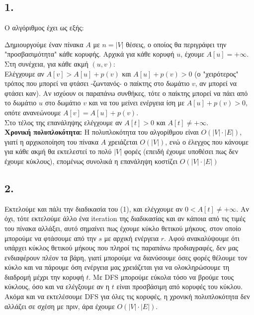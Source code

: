	\subsection*{1.}

		Ο αλγόριθμος έχει ως εξής:
		
		Δημιουργούμε έναν πίνακα $A$ με $n = |V|$ θέσεις, ο οποίος θα περιγράφει την "προσβασιμότητα" κάθε κορυφής. Αρχικά για κάθε κορυφή $u$, έχουμε $A[u] = +\infty$. Στη συνέχεια, για κάθε ακμή $(u, v)$: \\
		
		Ελέγχουμε αν $A[v] > A[u] + p(v)$ και $A[u] + p(v) > 0$ (ο "χειρότερος" τρόπος που μπορεί να φτάσει -ζωντανός- ο παίκτης στο δωμάτιο $v$, αν μπορεί να φτάσει καν). Αν ισχύουν οι παραπάνω συνθήκες, τότε ο παίκτης μπορεί να πάει από το δωμάτιο $u$ στο δωμάτιο $v$ και να του μείνει ενέργεια ίση με $A[u] + p(v) > 0$, οπότε ανανεώνουμε $A[v] = A[u] + p(v)$. \\
		
		Στο τέλος της επανάληψης ελέγχουμε αν $A[t] > 0$ και $A[t] \neq +\infty$. \\
		
		\textbf{Χρονική πολυπλοκότητα:} 
		Η πολυπλοκότητα του αλγορίθμου είναι $O(|V|\cdot|E|)$, γιατί η αρχικοποίηση του πίνακα $A$ χρειάζεται $O(|V|)$, ενώ ο έλεγχος που κάνουμε για κάθε ακμή θα εκτελεστεί το πολύ $|V|$ φορές (επειδή έχουμε υποθέσει πως δεν έχουμε κύκλους), επομένως συνολικά η επανάληψη κοστίζει $O(|V|\cdot|E|)$
		
	\subsection*{2.}
		
		Εκτελούμε και πάλι την διαδικασία του (1), και ελέγχουμε αν $0 < A[t] \neq +\infty$. Αν όχι, τότε εκτελούμε άλλο ένα iteration της διαδικασίας και αν κάποια από τις τιμές του πίνακα αλλάξει, αυτό σημαίνει πως έχουμε κύκλο θετικού μήκους, στον οποίο μπορούμε να φτάσουμε από την $s$ με αρχική ενέργεια $r$. Αφού ανακαλύψουμε ότι υπάρχει κύκλος θετικού μήκους που πληροί τις παραπάνω προδιαγραφές, δεν μας ενδιαφέρουν πλέον τα βάρη, γιατί μπορούμε να διανύσουμε όσες φορές θέλουμε τον κύκλο και να πάρουμε όση ενέργεια μας χρειάζεται για να ολοκληρώσουμε τη διαδρομή μέχρι την κορυφή $t$. Με DFS μπορούμε εύκολα τόσο να βρούμε τους κύκλους, όσο και να ελέγξουμε αν η $t$ είναι προσβάσιμη από κορυφές του κύκλου. Ακόμα και να εκτελέσουμε DFS για όλες τις κορυφές, η χρονική πολυπλοκότητα δεν αλλάζει σε σχέση με πριν, άρα έχουμε $O(|V|\cdot|E|)$.

